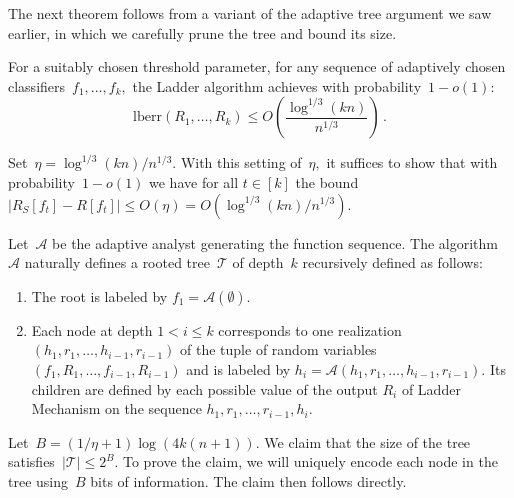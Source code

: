 \documentclass{tufte-book}
\begin{document}
The next theorem follows from a variant of the adaptive tree argument we
saw earlier, in which we carefully prune the tree and bound its
size.

\begin{Theorem}

For a suitably chosen threshold parameter, for any sequence of
adaptively chosen classifiers~\(f_1,\dots,f_k,\) the Ladder algorithm
achieves with probability~\(1-o(1)\): \[
\mathrm{lberr}(R_1,\dots,R_k)
\le O\left(\frac{\log^{1/3}(kn)}{n^{1/3}}\right)\,.
\]

\end{Theorem}

\begin{Proof}

Set~\(\eta = \log^{1/3}(kn)/n^{1/3}.\) With this setting of~\(\eta,\) it
suffices to show that with probability~\(1-o(1)\) we have for all
\(t\in[k]\) the bound
\(|R_S[f_t]-R[f_t]|\le O(\eta) = O(\log^{1/3}(kn)/n^{1/3})\).

Let~\(\mathcal{A}\) be the adaptive analyst generating the function
sequence. The algorithm~\(\mathcal{A}\) naturally defines a rooted
tree~\(\mathcal{T}\) of depth~\(k\) recursively defined as follows:

\begin{enumerate}
\def\labelenumi{\arabic{enumi}.}
\tightlist
\item
  The root is labeled by \(f_1 = \mathcal{A}(\emptyset).\)
\item
  Each node at depth \(1<i\le k\) corresponds to one realization
  \((h_1,r_1,\dots,h_{i-1},r_{i-1})\) of the tuple of random variables
  \((f_1,R_1,\dots,f_{i-1},R_{i-1})\) and is labeled by
  \(h_i = \mathcal{A}(h_1,r_1,\dots,h_{i-1},r_{i-1}).\) Its children are
  defined by each possible value of the output \(R_i\) of Ladder
  Mechanism on the sequence \(h_1,r_1,\dots,r_{i-1},h_i.\)
\end{enumerate}

Let~\(B = (1/\eta+1)\log(4k(n+1)).\) We claim that the size of the tree
satisfies~\(|\mathcal{T}|\le 2^B.\) To prove the claim, we will uniquely
encode each node in the tree using~\(B\) bits of information. The claim
then follows directly.


\end{Proof}
\end{document}

